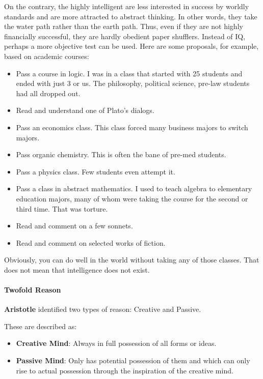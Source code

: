 On the contrary, the highly intelligent are less interested in success by worldly standards and are more attracted to abstract thinking. In other words, they take the water path rather than the earth path. Thus, even if they are not highly financially successful, they are hardly obedient paper shufflers. Instead of IQ, perhaps a more objective test can be used. Here are some proposals, for example, based on academic courses:

\begin{itemize}


\item Pass a course in logic. I was in a class that started with 25 students and ended with just 3 or us. The philosophy, political science, pre-law students had all dropped out.

\item Read and understand one of Plato's dialogs.

\item Pass an economics class. This class forced many business majors to switch majors.

\item Pass organic chemistry. This is often the bane of pre-med students.

\item Pass a physics class. Few students even attempt it.

\item Pass a class in abstract mathematics. I used to teach algebra to elementary education majors, many of whom were taking the course for the second or third time. That was torture.

\item Read and comment on a few sonnets.

\item Read and comment on selected works of fiction.
\end{itemize}


Obviously, you can do well in the world without taking any of those classes. That does not mean that intelligence does not exist.

\paragraph{Twofold Reason}


\textbf{Aristotle} identified two types of reason: Creative and Passive.

These are described as:

\begin{itemize}


\item \textbf{Creative Mind}: Always in full possession of all forms or ideas.

\item \textbf{Passive Mind}: Only has potential possession of them and which can only rise to actual possession through the inspiration of the creative mind.
\end{itemize}


